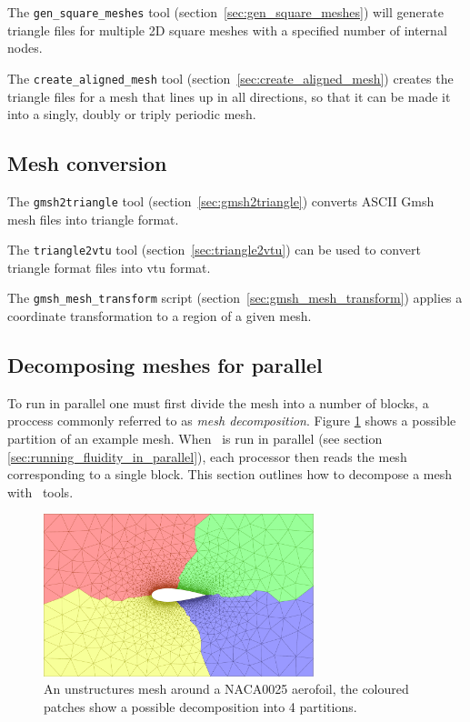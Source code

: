 The \lstinline[language = bash]+gen_square_meshes+ tool (section~\ref{sec:gen_square_meshes})  will generate triangle files for multiple 2D square meshes with a specified number of internal nodes.

The \lstinline[language = bash]+create_aligned_mesh+ tool (section~\ref{sec:create_aligned_mesh}) creates the triangle files for a mesh that lines up in all directions, so that it can be made it into a singly, doubly or triply periodic mesh.

\subsection{Mesh conversion}

The \lstinline[language = Bash]+gmsh2triangle+ tool (section~\ref{sec:gmsh2triangle}) converts ASCII Gmsh mesh files into triangle format.

The \lstinline[language = Bash]+triangle2vtu+ tool (section~\ref{sec:triangle2vtu}) can be used to convert triangle format files into vtu format. 

The \lstinline[language = Bash]+gmsh_mesh_transform+ script (section~\ref{sec:gmsh_mesh_transform}) applies a coordinate transformation to a region of a given mesh. 

\subsection{Decomposing meshes for parallel}
\label{decomp_meshes_parallel}
To run in parallel one must first divide the mesh into a number of blocks, a proccess
commonly referred to as \emph{mesh decomposition}. Figure \ref{fig:NACA0025_mesh_with_partitions}
shows a possible partition of an example mesh. When \fluidity\ is run in parallel (see section
\ref{sec:running_fluidity_in_parallel}), each processor then reads the mesh corresponding to a
single block. This section outlines how to decompose a mesh with \fluidity\ tools.
\begin{figure}[htbp]
 \centering
  \includegraphics[width=0.7\textwidth]{misc_images/NACA0025_mesh_with_partitions.pdf}
  \caption{An unstructures mesh around a NACA0025 aerofoil, the coloured patches show a
           possible decomposition into 4 partitions.}
  \label{fig:NACA0025_mesh_with_partitions}
\end{figure}

